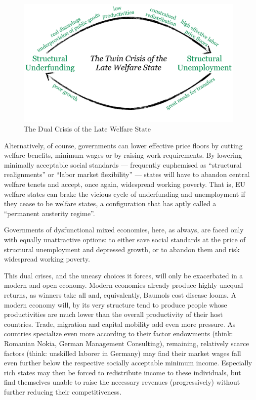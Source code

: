 \documentclass[11pt,a4paper,oneside,openright]{article}
\begin{document}
\begin{figure}[htbp]
	\begin{center}
	\includegraphics[width=1\textwidth]{./img/dual-crisis}  
	\caption{The Dual Crisis of the Late Welfare State}
	\label{fig:dual-crisis}
	\end{center}
\end{figure} %

Alternatively, of course, governments can lower effective price floors by cutting welfare benefits, minimum wages or by raising work requirements. 
By lowering minimally acceptable social standards --- frequently euphemised as ``structural realignments'' or ``labor market flexibility'' --- states will have to abandon central welfare tenets and accept, once again, widespread working poverty. 
That is, \gls{EU} welfare states can brake the vicious cycle of underfunding and unemployment if they cease to be welfare states, a configuration that \cite{Streeck2010c} has aptly called a ``permanent austerity regime''. 

Governments of dysfunctional mixed economies, here, as always, are faced only with equally unattractive options: 
to either save social standards at the price of structural unemployment and depressed growth, or to abandon them and risk widespread working poverty.

This dual crises, and the uneasy choices it forces, will only be exacerbated in a modern and open economy. 
Modern economies already produce highly unequal returns, as winners take all and, equivalently, Baumols cost disease looms. 
A modern economy will, by its very structure tend to produce people whose productivities are much lower than the overall productivity of their host countries. 
Trade, migration and capital mobility add even more pressure. 
As countries specialize even more according to their factor endowments (think: Romanian Nokia, German Management Consulting), remaining, relatively scarce factors (think: unskilled laborer in Germany) may find their market wages fall even further below the respective socially acceptable minimum income. 
Especially rich states may then be forced to redistribute income to these individuals, but find themselves unable to raise the necessary revenues (progressively) without further reducing their competitiveness. 
\end{document}
